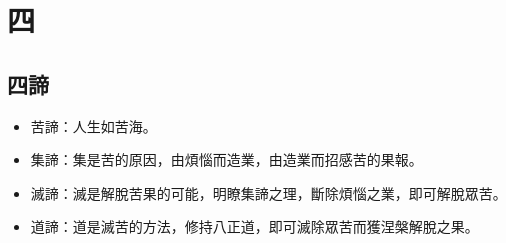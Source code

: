 \section{四}

\subsection{四諦}
\begin{itemize}
  \item 苦諦：人生如苦海。
  \item 集諦：集是苦的原因，由煩惱而造業，由造業而招感苦的果報。
  \item 滅諦：滅是解脫苦果的可能，明瞭集諦之理，斷除煩惱之業，即可解脫眾苦。
  \item 道諦：道是滅苦的方法，修持八正道，即可滅除眾苦而獲涅槃解脫之果。
\end{itemize}
